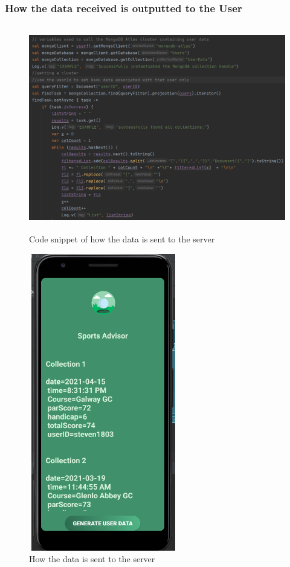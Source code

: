 \subsubsection{How the data received is outputted to the User}
\begin{figure}[H]
    \centering
    \includegraphics[width=15cm, height = 9cm]{img/getMongoDBdata.PNG}
    \caption{Code snippet of how the data is sent to the server}
    \label{fig:altas config}
\end{figure}

\begin{figure}[H]
    \centering
    \includegraphics[width=6.5cm, height = 13cm]{img/userHistoryPage.PNG}
    \caption{How the data is sent to the server}
    \label{fig:altas config}
\end{figure}

